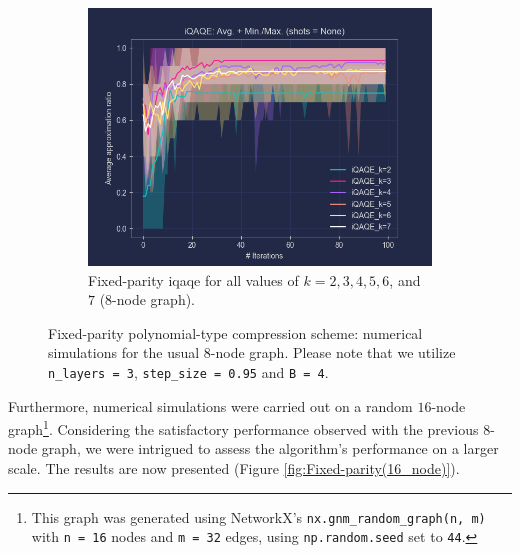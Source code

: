 \clearpage

\begin{figure}[ht!]
  \addtocounter{figure}{-1} %
  \centering
  \begin{subfigure}[b]{1\textwidth}
      \addtocounter{subfigure}{2} %
      \centering
      \includegraphics[width=1\textwidth]{Figures/Chapter_5/Fixed-parity/All_k's(8-node).png}
      \caption{Fixed-parity \acrshort{iqaqe} for all values of $k = 2, 3, 4, 5, 6$, and $7$ ($8$-node graph).}
      \label{fig:Fixed-parity/All_k's}
  \end{subfigure}
  \caption{Fixed-parity polynomial-type compression scheme: numerical simulations for the usual $8$-node graph. Please note that we utilize \texttt{n\_layers = 3}, \texttt{step\_size = 0.95} and \texttt{B = 4}.}
  \label{fig:Fixed-parity}
\end{figure}

Furthermore, numerical simulations were carried out on a random $16$-node graph\footnote{This graph was generated using NetworkX's \texttt{nx.gnm\_random\_graph(n, m)} with \texttt{n = 16} nodes and \texttt{m = 32} edges, using \texttt{np.random.seed} set to \texttt{44}.}. Considering the satisfactory performance observed with the previous $8$-node graph, we were intrigued to assess the algorithm's performance on a larger scale. The results are now presented (Figure \ref{fig:Fixed-parity(16_node)}).

